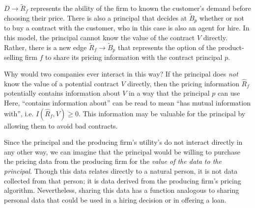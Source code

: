 \documentclass[../thesis.tex]{subfiles}
\begin{document}
\begin{center}
\end{center}

$D \rightarrow \tilde{R}_f$ represents the ability of
the firm to known the customer's demand before choosing their
price.
There is also a principal that decides at $\tilde{B}_p$
whether or not to buy a contract with the customer, who
in this case is also an agent for hire.
In this model, the principal cannot know the value
of the contract $V$ directly.
Rather, there is a new edge $\tilde{R}_f \rightarrow \tilde{B}_p$
that represents
the option of the product-selling firm $f$ to share its
pricing information with the contract principal $p$.

Why would two companies ever interact in this way?
If the principal does \emph{not} know the value of
a potential contract $V$ directly, then the pricing
information $\hat{R}_f$ potentially contains information
about $V$ in a way that the principal $p$ can use
Here, ``contains information about'' can be read to
mean ``has mutual information with'', i.e.
$I(\hat{R}_f, V) \geq 0$.
This information may be valuable for the principal
by allowing them to avoid bad contracts.

Since the principal and the producing firm's utility's
do not interact directly in any other way, we can
imagine that the principal would be willing to
purchase the pricing data from the producing firm
for the \emph{value of the data to the principal}.
Though this data relates directly to
a natural person, it is not data collected from that
person; it is data derived from the producing firm's
pricing algorithm.
Nevertheless, sharing this data has a function analogous
to sharing personal data that could be used in a hiring decision
or in offering a loan.
\end{document}
